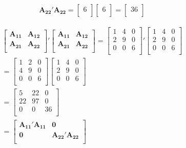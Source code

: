\documentclass[12pt]{article}
\begin{document}
\begin{eqnarray*}
 \mathbf{A_{22}'A_{22}}=
\begin{bmatrix}
6\\
\end{bmatrix}
\begin{bmatrix}
6\\
\end{bmatrix}=
\begin{bmatrix}
36\\
\end{bmatrix}
\end{eqnarray*}

\begin{eqnarray*}
\begin{bmatrix} 
\mathbf{A_{11}} & \mathbf{A_{12}}  \\
\mathbf{A_{21}} & \mathbf{A_{22}}  \\
\end{bmatrix}'
\begin{bmatrix} 
\mathbf{A_{11}} & \mathbf{A_{12}}  \\
\mathbf{A_{21}} & \mathbf{A_{22}}  \\
\end{bmatrix} = 
\begin{bmatrix} 
1&4&0  \\
2&9&0\\
0&0&6\\
\end{bmatrix}'
\begin{bmatrix} 
1&4&0  \\
2&9&0\\
0&0&6\\
\end{bmatrix}\\ =
\begin{bmatrix} 
1&2&0  \\
4&9&0\\
0&0&6\\
\end{bmatrix}
\begin{bmatrix} 
1&4&0  \\
2&9&0\\
0&0&6\\
\end{bmatrix}\\=
\begin{bmatrix} 
5&22&0  \\
22&97&0\\
0&0&36\\
\end{bmatrix}\\=
\begin{bmatrix} 
\mathbf{A_{11}' A_{11}} & \mathbf{0} \\
\mathbf{0}& \mathbf{A_{22}'A_{22}}  \\
\end{bmatrix} 
\end{eqnarray*}
\end{document}
